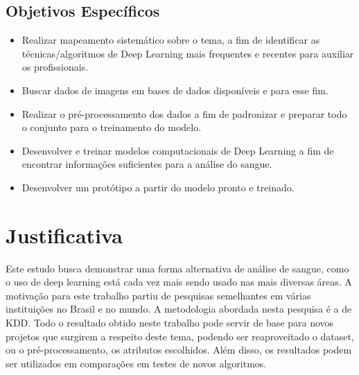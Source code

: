 
\subsection{Objetivos Específicos}
\begin{itemize}
   \item Realizar mapeamento sistemático sobre o tema, a fim de identificar as técnicas/algoritmos de
Deep Learning mais frequentes e recentes para auxiliar os profissionais.
   \item Buscar dados de imagens em bases de dados disponíveis e para esse fim.
   \item Realizar o pré-processamento dos dados a fim de padronizar e preparar todo o conjunto para o treinamento do modelo.
   \item Desenvolver e treinar modelos computacionais de Deep Learning a fim de encontrar informações suficientes para a análise do sangue.
   \item Desenvolver um protótipo a partir do modelo pronto e treinado.
\end{itemize}



\section{Justificativa}
\label{sec:justificativa}
Este estudo busca demonstrar uma forma alternativa de análise de sangue, como o uso de deep learning está cada vez mais sendo usado nas mais diversas áreas. A motivação para este trabalho partiu de pesquisas semelhantes em várias instituições no Brasil e no mundo. A metodologia abordada nesta pesquisa é a de KDD. Todo o resultado obtido neste trabalho pode servir de base para novos projetos que surgirem a respeito deste tema, podendo ser reaproveitado o dataset, ou o pré-processamento, os atributos escolhidos. Além disso, os resultados podem ser utilizados em comparações em testes de novos algoritmos.


